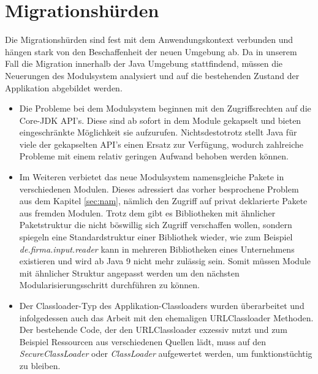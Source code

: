 \section{Migrationshürden} \label{MigH}

	Die Migrationshürden sind fest mit dem Anwendungskontext verbunden und hängen stark von den Beschaffenheit der neuen Umgebung ab. Da in unserem Fall die Migration innerhalb der Java Umgebung stattfindend, müssen die Neuerungen des Modulsystem analysiert und auf die bestehenden Zustand der Applikation abgebildet werden.\bigbreak

\begin{itemize}
	\item Die Probleme bei dem Modulsystem beginnen mit den Zugriffsrechten auf die Core-JDK API's. Diese sind ab sofort in dem Module gekapselt und bieten eingeschränkte Möglichkeit sie aufzurufen. Nichtsdestotrotz stellt Java für viele der gekapselten API's einen Ersatz zur Verfügung, wodurch zahlreiche Probleme mit einem relativ geringen Aufwand behoben werden können. 


	\item Im Weiteren verbietet das neue Modulsystem namensgleiche Pakete in verschiedenen Modulen. Dieses adressiert das vorher besprochene Problem aus dem Kapitel \ref{sec:nam}, nämlich den Zugriff auf privat deklarierte Pakete aus fremden Modulen. Trotz dem gibt es Bibliotheken mit ähnlicher Paketstruktur die nicht böswillig sich Zugriff verschaffen wollen, sondern spiegeln eine Standardstruktur einer Bibliothek wieder, wie zum Beispiel \textit{de.firma.input.reader} kann in mehreren Bibliotheken eines Unternehmens existieren und wird ab Java 9 nicht mehr zulässig sein. Somit müssen Module mit ähnlicher Struktur angepasst werden um den nächsten Modularisierungsschritt durchführen zu können.


	\item Der Classloader-Typ des Applikation-Classloaders wurden überarbeitet und infolgedessen auch das Arbeit mit den ehemaligen URLClassloader Methoden. Der bestehende Code, der den URLClassloader exzessiv nutzt und zum Beispiel Ressourcen aus verschiedenen Quellen lädt, muss auf den \textit{SecureClassLoader} oder  \textit{ClassLoader} aufgewertet werden, um funktionstüchtig zu bleiben. 



\end{itemize}
